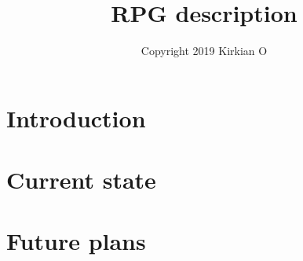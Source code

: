 \documentclass[10pt,fleqn]{article}
\title{RPG description}
\author{Copyright 2019 Kirkian O}
\begin{document}
\maketitle

\tableofcontents

\section{Introduction}\label{sec:intro}


\section{Current state}\label{sec:current}


\section{Future plans}\label{sec:future}

\end{document}
